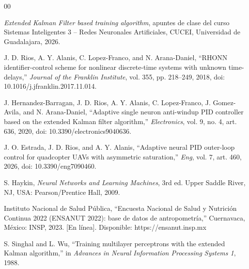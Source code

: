 \documentclass[conference]{IEEEtran}
\begin{document}
\begin{thebibliography}{00}

 \textit{Extended Kalman Filter based training algorithm}, apuntes de clase del curso Sistemas Inteligentes 3 -- Redes Neuronales Artificiales, CUCEI, Universidad de Guadalajara, 2026.

 J. D. Rios, A. Y. Alanis, C. Lopez-Franco, and N. Arana-Daniel, ``RHONN identifier-control scheme for nonlinear discrete-time systems with unknown time-delays,'' \textit{Journal of the Franklin Institute}, vol. 355, pp. 218--249, 2018, doi: 10.1016/j.jfranklin.2017.11.014.

 J. Hernandez-Barragan, J. D. Rios, A. Y. Alanis, C. Lopez-Franco, J. Gomez-Avila, and N. Arana-Daniel, ``Adaptive single neuron anti-windup PID controller based on the extended Kalman filter algorithm,'' \textit{Electronics}, vol. 9, no. 4, art. 636, 2020, doi: 10.3390/electronics9040636.

 J. O. Estrada, J. D. Rios, and A. Y. Alanis, ``Adaptive neural PID outer-loop control for quadcopter UAVs with asymmetric saturation,'' \textit{Eng}, vol. 7, art. 460, 2026, doi: 10.3390/eng7090460.

 S. Haykin, \textit{Neural Networks and Learning Machines}, 3rd ed. Upper Saddle River, NJ, USA: Pearson/Prentice Hall, 2009.

 Instituto Nacional de Salud Pública, ``Encuesta Nacional de Salud y Nutrición Continua 2022 (ENSANUT 2022): base de datos de antropometría,'' Cuernavaca, México: INSP, 2023. [En línea]. Disponible: https://ensanut.insp.mx

 S. Singhal and L. Wu, ``Training multilayer perceptrons with the extended Kalman algorithm,'' in \textit{Advances in Neural Information Processing Systems 1}, 1988.

\end{thebibliography}
\end{document}
